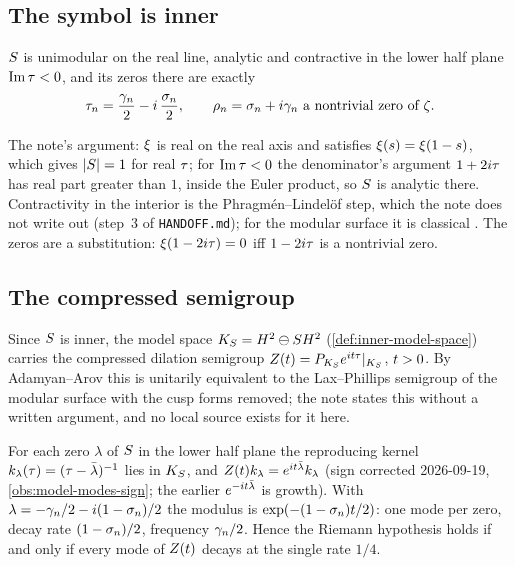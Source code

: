 \subsection{The symbol is inner}

\begin{proposition}
\label{prop:scattering-inner}
$S$ is unimodular on the real line, analytic and contractive in the lower half plane
$\operatorname{Im}\tau<0$, and its zeros there are exactly
\[
  \tau_n = \frac{\gamma_{n}}{2} - i\,\frac{\sigma_n}{2},
  \qquad \rho_n = \sigma_n + i\gamma_{n} \text{ a nontrivial zero of } \zeta .
\]
\end{proposition}

The note's argument: $\xi$ is real on the real axis and satisfies $\xi(s) = \xi(1-s)$,
which gives $|S| = 1$ for real $\tau$; for $\operatorname{Im}\tau<0$ the denominator's argument
$1+2i\tau$ has real part greater than $1$, inside the Euler product, so $S$ is
analytic there. Contractivity in the interior is the Phragm\'en--Lindel\"of step, which
the note does not write out (step~3 of \texttt{HANDOFF.md}); for the modular surface it is
classical \cite{faddeev1972scattering,laxphillips1976}. The zeros are a substitution:
$\xi(1-2i\tau) = 0$ iff $1-2i\tau$ is a nontrivial zero.

\subsection{The compressed semigroup}

Since $S$ is inner, the model space $K_S = H^2\ominus S H^2$
(\cref{def:inner-model-space}) carries the compressed dilation semigroup $Z(t) =
P_{K_S}e^{it\tau}|_{K_S}$, $t>0$. By Adamyan--Arov this is unitarily equivalent to
the Lax--Phillips semigroup of the modular surface with the cusp forms removed; the note
states this without a written argument, and no local source exists for it here.

\begin{proposition}
\label{prop:functional-model-modes}
For each zero $\lambda$ of $S$ in the lower half plane the reproducing kernel
$k_\lambda(\tau) = (\tau-\bar\lambda)^{-1}$ lies in $K_S$, and $Z(t) k_\lambda =
e^{it\bar\lambda}k_\lambda$ (sign corrected 2026-09-19, \cref{obs:model-modes-sign}; the
earlier $e^{-it\bar\lambda}$ is growth). With $\lambda = -\gamma_{n}/2 - i(1-\sigma_n)/2$ the modulus
is $\exp(-(1-\sigma_n)t/2)$: one mode per zero, decay rate $(1-\sigma_n)/2$, frequency $\gamma_{n}/2$. Hence the Riemann hypothesis holds if and only if every mode of
$Z(t)$ decays at the single rate $1/4$.
\end{proposition}

